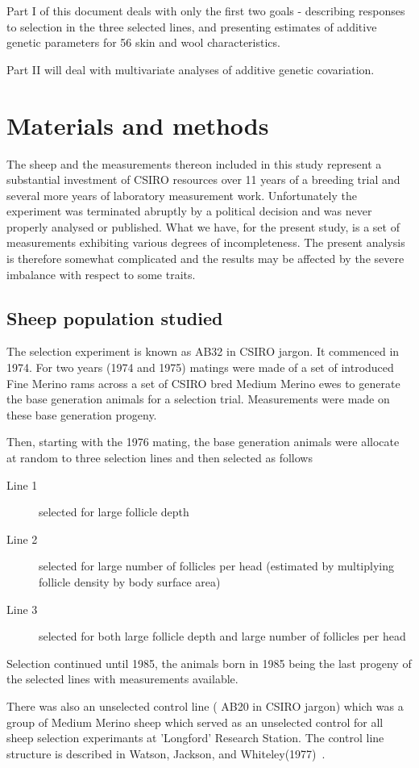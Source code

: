 \documentclass[titlepage]{article}  %
\begin{document}
Part I of this document deals with only the first two goals - describing responses to selection in the three selected lines, and presenting estimates of additive genetic parameters for 56 skin and wool characteristics.

Part II will deal with multivariate analyses of additive genetic covariation.

\section{Materials and methods}
The sheep and the measurements thereon included in this study represent a substantial investment of CSIRO resources over 11 years of a breeding trial and several more years of laboratory measurement work. Unfortunately the experiment was terminated abruptly by a political decision and was never properly analysed or published. What we have, for the present study, is a set of measurements exhibiting various degrees of incompleteness. The present analysis is therefore somewhat complicated and the results may be affected by the severe imbalance with respect to some traits.

\subsection{ Sheep population studied}
The selection experiment is known as AB32 in CSIRO jargon. It commenced in 1974. For two years (1974 and 1975) matings were made of a set of introduced Fine Merino rams across a set of CSIRO bred Medium Merino ewes to generate the base generation animals for a selection trial. Measurements were made on these base generation progeny.

Then, starting with the 1976 mating, the base generation animals were allocate at random to three selection lines and then selected as follows
\begin{description}
\item[Line 1] selected for large follicle depth
\item[Line 2] selected for large number of follicles per head (estimated by multiplying follicle density by body surface area)
\item[Line 3] selected for both large follicle depth and large number of follicles per head
\end{description}
Selection continued until 1985, the animals born in 1985 being the last progeny of the selected lines with measurements available.

There was also an unselected control line ( AB20 in CSIRO jargon) which was a group of Medium Merino sheep which served as an unselected control for all sheep selection experimants at 'Longford' Research Station. The control line structure is described in Watson, Jackson, and Whiteley(1977)~\cite{wats:77}.
\end{document}
